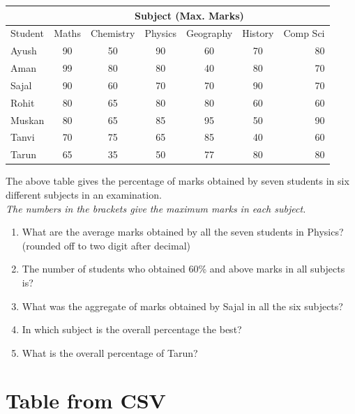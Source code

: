 \documentclass{article}
\begin{document}
\begin{table}[h]
\begin{tabular}{|l|c|c|c|c|c|r|}
\hline
	& \multicolumn{6}{c}{Subject (Max. Marks)} \\ \hline
 Student & Maths	 & Chemistry	 & Physics & Geography & History & Comp Sci \\ \hline
Ayush	& 90 & 50 & 90 & 60 & 70 & 80 \\
Aman	    & 99 & 80 & 80 & 40 & 80 & 70 \\
Sajal	& 90 & 60 & 70 & 70 & 90 & 70 \\
Rohit	& 80 & 65 & 80 & 80 & 60 & 60 \\
Muskan	& 80 & 65 & 85 & 95 & 50 & 90 \\
Tanvi	& 70	 & 75 & 65 & 85 & 40 & 60 \\
Tarun	& 65 & 35 & 50 & 77 & 80	& 80 \\
\hline
\end{tabular}
\end{table}
\noindent \cite{theory} 
The above table gives the percentage of marks obtained by seven students in six different subjects in an examination. \\ 
\textit{The numbers in the brackets give the maximum marks in each subject.}

\begin{enumerate}
\item What are the average marks obtained by all the seven students in Physics? (rounded off to two digit after decimal)
\item The number of students who obtained 60\% and above marks in all subjects is?
\item What was the aggregate of marks obtained by Sajal in all the six subjects?
\item In which subject is the overall percentage the best?
\item What is the overall percentage of Tarun?
\end{enumerate}

\section{Table from CSV}
\end{document}
